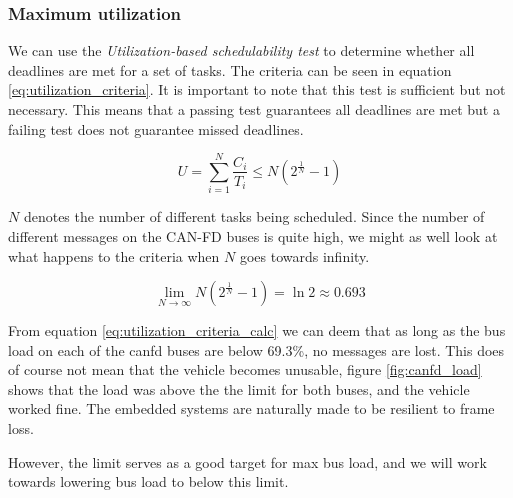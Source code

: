\subsubsection{Maximum utilization} \label{sec:max_util}

We can use the \emph{Utilization-based schedulability test} \cite{ttk4147} to determine whether all deadlines are met for a set of tasks. The criteria can be seen in equation \ref{eq:utilization_criteria}. It is important to note that this test is sufficient but not necessary. This means that a passing test guarantees all deadlines are met but a failing test does not guarantee missed deadlines.

\begin{equation}
    U=\sum_{i=1}^N\frac{C_i}{T_i}\leq N\left(2^\frac{1}{N}-1\right)
    \label{eq:utilization_criteria}
\end{equation}

$N$ denotes the number of different tasks being scheduled. Since the number of different messages on the CAN-FD buses is quite high, we might as well look at what happens to the criteria when $N$ goes towards infinity.

\begin{equation}
    \lim_{N\rightarrow\infty} N\left(2^\frac{1}{N}-1\right)=\ln{2}\approx 0.693
    \label{eq:utilization_criteria_calc}
\end{equation}

From equation \ref{eq:utilization_criteria_calc} we can deem that as long as the bus load on each of the \acrshort{canfd} buses are below 69.3\%, no messages are lost. This does of course not mean that the vehicle becomes unusable, figure \ref{fig:canfd_load} shows that the load was above the the limit for both buses, and the vehicle worked fine. The embedded systems are naturally made to be resilient to frame loss.

However, the limit serves as a good target for max bus load, and we will work towards lowering bus load to below this limit.




